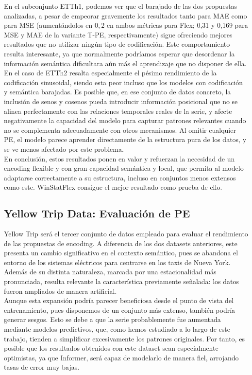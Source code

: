 En el subconjunto ETTh1, podemos ver que el barajado de las dos propuestas analizadas, a pesar de empeorar gravemente los resultados tanto para MAE como para MSE (aumentándolos en $0,2$ en ambos métricas para Flex; 0,31 y 0,169 para MSE y MAE de la variante T-PE, respectivamente) sigue ofreciendo mejores resultados que no utilizar ningún tipo de codificación. Este comportamiento resulta interesante, ya que normalmente podríamos esperar que desordenar la información semántica dificultara aún más el aprendizaje que no disponer de ella.\\

En el caso de ETTh2 resalta especialmente el pésimo rendimiento de la codificación sinusoidal, siendo esta peor incluso que los modelos con codificación y semántica barajadas. Es posible que, en ese conjunto de datos concreto, la inclusión de senos y cosenos pueda introducir información posicional que no se alinea perfectamente con las relaciones temporales reales de la serie, y afecte negativamente la capacidad del modelo para capturar patrones relevantes cuando no se complementa adecuadamente con otros mecanismos. Al omitir cualquier PE, el modelo parece aprender directamente de la estructura pura de los datos, y se ve menos afectado por este problema.\\

En conclusión, estos resultados ponen en valor y refuerzan la necesidad de un encoding flexible y con gran capacidad semántica y local, que permita al modelo adaptarse correctamente a su estructura, incluso en conjuntos menos extensos como este. WinStatFlex consigue el mejor resultado como prueba de ello.

\subsection{Yellow Trip Data: Evaluación de PE}

Yellow Trip será el tercer conjunto de datos empleado para evaluar el rendimiento de las propuestas de encoding. A diferencia de los dos datasets anteriores, este presenta un cambio significativo en el contexto semántico, pues se abandona el entorno de los sistemas eléctricos para centrarse en los taxis de Nueva York. Además de su distinta naturaleza, marcada por una estacionalidad más pronunciada, resulta relevante la característica previamente señalada: los datos fueron ampliados de manera artificial. \\

Aunque esta expansión podría parecer beneficiosa desde el punto de vista del entrenamiento, pues disponemos de un conjunto más extenso, también podría generar sesgos. Esto se debe a que la serie probablemente fue aumentada mediante modelos predictivos, que, como hemos estudiado a lo largo de este trabajo, tienden a simplificar excesivamente los patrones originales. Por tanto, es posible que los resultados obtenidos con este dataset sean especialmente optimistas, ya que Informer, será capaz de modelarlo de manera fiel, arrojando tasas de error muy bajas.\\


